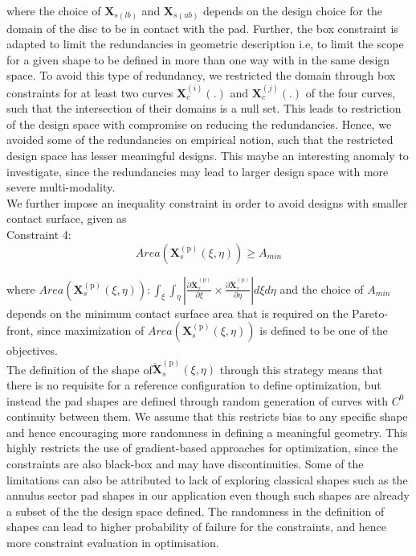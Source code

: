 where the choice of $\bm X_{s(lb)}$ and $\bm X_{s(ub)}$ depends on the design choice for the domain of the disc to be in contact with the pad. Further, the box constraint is adapted to limit the redundancies in geometric description i.e, to limit the scope for a given shape to be defined in more than one way with in the same design space. To avoid this type of redundancy, we restricted the domain through box constraints for at least two curves $\bm X_{c}^{(i)}(.)$ and $\bm X_{c}^{(j)}(.)$ of the four curves, such that the intersection of their domains is a null set. This leads to restriction of the design space with compromise on reducing the redundancies. Hence, we avoided some of the redundancies on empirical notion, such that the restricted design space has lesser meaningful designs. This maybe an interesting anomaly to investigate, since the redundancies may lead to larger design space with more severe multi-modality.\\   

We further impose an inequality constraint in order to avoid designs with smaller contact surface, given as\\

Constraint 4: \\
\begin{equation}
    Area(\bm X_{s}^{(\mathrm p)}(\xi,\eta)) \geq A_{min}
\end{equation}

where $Area(\bm X_{s}^{(\mathrm p)}(\xi,\eta)): \int_{\xi}\int_{\eta}|\frac{\partial \bm {\check{X}}_{s}^{(\mathrm p)}}{\partial \xi} \times \frac{\partial \bm {\check{X}}_{s}^{(\mathrm p)}}{\partial \eta}|d\xi d\eta$ and the choice of $A_{min}$ depends on the minimum contact surface area that is required on the Pareto-front, since maximization of $Area(\bm X_{s}^{(\mathrm p)}(\xi,\eta))$ is defined to be one of the objectives.\\

The definition of the shape of$ \bm {\check{X}}_{s}^{(\mathrm p)}(\xi,\eta)$ through this strategy means that there is no requisite for a reference configuration to define optimization, but instead the pad shapes are defined through random generation of curves with $C^0$ continuity between them. We assume that this restricts bias to any specific shape and hence encouraging more randomness in defining a meaningful geometry. 
This highly restricts the use of gradient-based approaches for optimization, since the constraints are also black-box and may have discontinuities. 
Some of the limitations can also be attributed to lack of exploring classical shapes such as the annulus sector pad shapes in our application even though such shapes are already a subset of the the design space defined. The randomness in the definition of shapes can lead to higher probability of failure for the constraints, and hence more constraint evaluation in optimisation.\\

